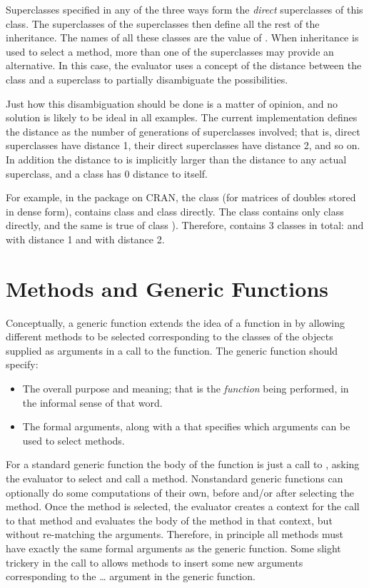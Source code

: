 \documentclass[11pt]{article}
\begin{document}
Superclasses specified in any of the three ways form the \emph{direct} superclasses of this class.
The superclasses of the superclasses then define all the rest of the inheritance.
The names of all these classes are the value of .
When inheritance is used to select a method, more than one of the superclasses may provide an alternative.
In this case, the evaluator uses a concept of the distance between the class and a superclass to partially disambiguate the possibilities.

Just how this disambiguation should be done is a matter of opinion, and no solution is likely to be ideal in all examples.
The current \R{} implementation defines the distance as the number of generations of superclasses involved; that is, direct superclasses have distance 1, their direct superclasses have distance 2, and so on.
In addition the distance to  is implicitly larger than the distance to any actual superclass, and a class has 0 distance to itself.

For example, in the  package on CRAN, the class  (for matrices of doubles stored in dense form), contains class  and class  directly.
The class  contains only class  directly, and the same is true of class ).  Therefore,  contains 3 classes in total:  and  with distance 1 and  with distance 2.


\section{Methods and Generic Functions}
\label{sec:meth-gener-funct}

Conceptually, a generic function extends the idea of a function in \R{} by allowing different methods to be selected corresponding to the classes of the objects supplied as arguments in a call to the function.
The generic function should specify:
\begin{itemize}
\item The overall purpose and meaning; that is the \emph{function} being performed, in the informal sense of that word.
\item The formal arguments, along with a  that specifies which arguments can be used to select methods.
\end{itemize}
For a standard generic function the body of the function is just a call to , asking the evaluator to select and call a method.
Nonstandard generic functions can optionally do some computations of their own, before and/or after selecting the method.
Once the method is selected, the evaluator creates a context for the call to that method and evaluates the body of the method in that context, but without re-matching the arguments.
Therefore, in principle all methods must have exactly the same formal arguments as the generic function.
Some slight trickery in the call to  allows methods to insert some new arguments corresponding to the \dots{} argument in the generic function.
\end{document}
